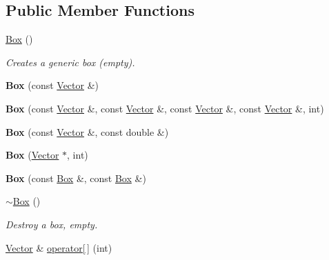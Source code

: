 \subsection*{\-Public \-Member \-Functions}
\begin{DoxyCompactItemize}
\item 
\hypertarget{class_box_aca78d7db44972bfa78d46b7bbc8796f6}{
\hyperlink{class_box_aca78d7db44972bfa78d46b7bbc8796f6}{\-Box} ()}
\label{class_box_aca78d7db44972bfa78d46b7bbc8796f6}

\begin{DoxyCompactList}\small\item\em \-Creates a generic box (empty). \end{DoxyCompactList}\item 
\hypertarget{class_box_ab4a2a18916c428de651b22cdf280bf3e}{
{\bfseries \-Box} (const \hyperlink{class_vector}{\-Vector} \&)}
\label{class_box_ab4a2a18916c428de651b22cdf280bf3e}

\item 
\hypertarget{class_box_a1f9d59659dc2304ed62088464f48c4da}{
{\bfseries \-Box} (const \hyperlink{class_vector}{\-Vector} \&, const \hyperlink{class_vector}{\-Vector} \&, const \hyperlink{class_vector}{\-Vector} \&, const \hyperlink{class_vector}{\-Vector} \&, int)}
\label{class_box_a1f9d59659dc2304ed62088464f48c4da}

\item 
\hypertarget{class_box_aa151dd75dfbe1632979853fe157322ea}{
{\bfseries \-Box} (const \hyperlink{class_vector}{\-Vector} \&, const double \&)}
\label{class_box_aa151dd75dfbe1632979853fe157322ea}

\item 
\hypertarget{class_box_a85ed08338073ace8d12833af0c861efb}{
{\bfseries \-Box} (\hyperlink{class_vector}{\-Vector} $\ast$, int)}
\label{class_box_a85ed08338073ace8d12833af0c861efb}

\item 
\hypertarget{class_box_a0a7c6f0b0405db01518bb3201b00c9a2}{
{\bfseries \-Box} (const \hyperlink{class_box}{\-Box} \&, const \hyperlink{class_box}{\-Box} \&)}
\label{class_box_a0a7c6f0b0405db01518bb3201b00c9a2}

\item 
\hypertarget{class_box_a6a5e09398e85d602a046b429062fb9c2}{
\hyperlink{class_box_a6a5e09398e85d602a046b429062fb9c2}{$\sim$\-Box} ()}
\label{class_box_a6a5e09398e85d602a046b429062fb9c2}

\begin{DoxyCompactList}\small\item\em \-Destroy a box, empty. \end{DoxyCompactList}\item 
\hypertarget{class_box_ad41f9a6efac5787613914b12e4c3d11d}{
\hyperlink{class_vector}{\-Vector} \& \hyperlink{class_box_ad41f9a6efac5787613914b12e4c3d11d}{operator\mbox{[}$\,$\mbox{]}} (int)}
\label{class_box_ad41f9a6efac5787613914b12e4c3d11d}


\end{DoxyCompactItemize}

